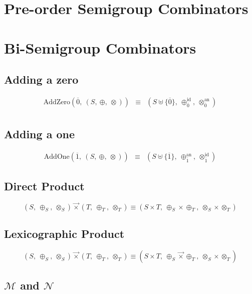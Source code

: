 \documentclass[10pt]{article}
\newcommand{\lexprod}{\ensuremath{\mathbin{\vec{\times}}}}
\begin{document}
\section{Pre-order Semigroup Combinators} 


\section{Bi-Semigroup Combinators} 

\subsection{Adding a zero} 
\[ 
\begin{array}{rcl} 
\mathrm{AddZero}(\overline{0},\ (S,\ \oplus,\ \otimes)) 
   & \equiv 
   & (S \uplus \{\overline{0}\},\ \oplus_{\overline{0}}^{\mathrm{id}},\ \otimes_{\overline{0}}^{\mathrm{an}}) \\
\end{array} 
\] 

\subsection{Adding a one} 

\[ 
\begin{array}{rcl} 
\mathrm{AddOne}(\overline{1},\ (S,\ \oplus,\ \otimes)) 
   & \equiv 
   & (S \uplus \{\overline{1}\},\  \oplus_{\overline{1}}^{\mathrm{an}},\ \otimes_{\overline{1}}^{\mathrm{id}})
\end{array} 
\] 

\subsection{Direct Product} 

\[
(S,\ \oplus_S,\ \otimes_S) \lexprod (T,\ \oplus_T,\ \otimes_T) 
\equiv
(S\times T,\ \oplus_S\times\oplus_T,\ \otimes_S\times\otimes_T)
\]


\subsection{Lexicographic Product} 

\[
(S,\ \oplus_S,\ \otimes_S) \lexprod (T,\ \oplus_T,\ \otimes_T) 
\equiv
(S\times T,\ \oplus_S\lexprod\oplus_T,\ \otimes_S\times\otimes_T)
\]

\subsection{$\mathcal{M}$ and $\mathcal{N}$}
\end{document}
